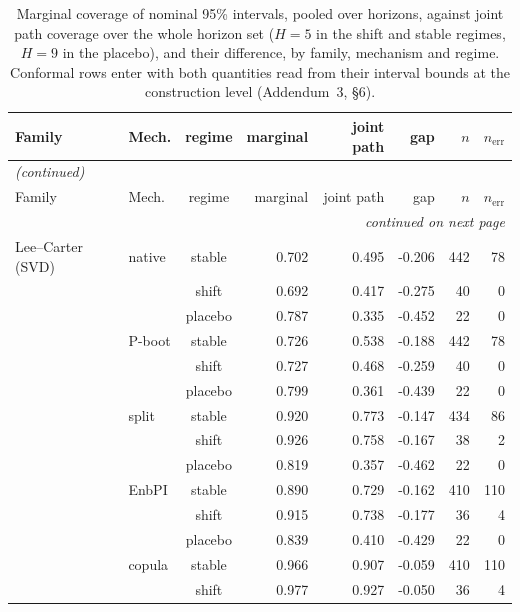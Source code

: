 {\footnotesize\setlength{\tabcolsep}{2.5pt}
\begin{longtable}{@{}llcrrrrr@{}}
\caption{Marginal coverage of nominal 95\% intervals, pooled over horizons, against joint path coverage over the whole horizon set ($H=5$ in the shift and stable regimes, $H=9$ in the placebo), and their difference, by family, mechanism and regime. Conformal rows enter with both quantities read from their interval bounds at the construction level (Addendum~3, \S6).}\label{tab:h3-joint} \\
\toprule
Family & Mech. & regime & marginal & joint path & gap & $n$ & $n_{\mathrm{err}}$ \\
\midrule
\endfirsthead
\multicolumn{8}{l}{\emph{(continued)}} \\
\toprule
Family & Mech. & regime & marginal & joint path & gap & $n$ & $n_{\mathrm{err}}$ \\
\midrule
\endhead
\midrule \multicolumn{8}{r}{\emph{continued on next page}} \\
\endfoot
\bottomrule
\endlastfoot
Lee--Carter (SVD) & native & stable & 0.702 & 0.495 & -0.206 & 442 & 78 \\
 &  & shift & 0.692 & 0.417 & -0.275 & 40 & 0 \\
 &  & placebo & 0.787 & 0.335 & -0.452 & 22 & 0 \\
 & P-boot & stable & 0.726 & 0.538 & -0.188 & 442 & 78 \\
 &  & shift & 0.727 & 0.468 & -0.259 & 40 & 0 \\
 &  & placebo & 0.799 & 0.361 & -0.439 & 22 & 0 \\
 & split & stable & 0.920 & 0.773 & -0.147 & 434 & 86 \\
 &  & shift & 0.926 & 0.758 & -0.167 & 38 & 2 \\
 &  & placebo & 0.819 & 0.357 & -0.462 & 22 & 0 \\
 & EnbPI & stable & 0.890 & 0.729 & -0.162 & 410 & 110 \\
 &  & shift & 0.915 & 0.738 & -0.177 & 36 & 4 \\
 &  & placebo & 0.839 & 0.410 & -0.429 & 22 & 0 \\
 & copula & stable & 0.966 & 0.907 & -0.059 & 410 & 110 \\
 &  & shift & 0.977 & 0.927 & -0.050 & 36 & 4 \\

\end{longtable}}
